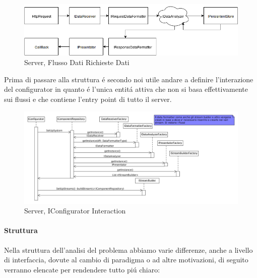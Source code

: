 \newpage

\begin{figure}[h]
\centering
\includegraphics[width=\textwidth]{Figures/LogicArchitecture/Server/FlowDiagramViewData}
\caption{Server, Flusso Dati Richieste Dati}
\end{figure}


Prima di passare alla struttura \'e secondo noi utile andare a definire l'interazione del configurator in quanto \'e l'unica entit\'a attiva che non si basa effettivamente sui flussi e che contiene l'entry point di tutto il server.

\begin{figure}[h]
\centering
\includegraphics[width=\textwidth]{Figures/LogicArchitecture/Server/IConfiguratorInteraction}
\caption{Server, IConfigurator Interaction}
\end{figure}


\paragraph{Struttura}

Nella struttura dell'analisi del problema abbiamo varie differenze, anche a livello di interfaccia, dovute al cambio di paradigma o ad altre motivazioni, di seguito verranno elencate per rendendere tutto pi\'u chiaro:

